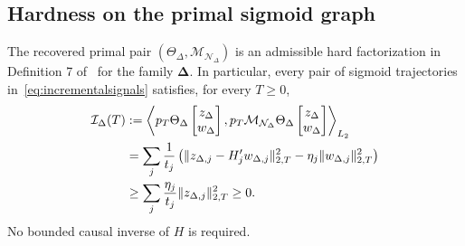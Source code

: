 \subsection{Hardness on the primal sigmoid graph}
\begin{prop}\label{prop:alternative}
The recovered primal pair $(\Theta_\Delta,\mathcal M_{\mathcal N_\Delta})$ is an admissible hard factorization in Definition 7 of~\cite{dualPIE} for the family $\boldsymbol\Delta$. In particular, every pair of sigmoid trajectories in~\eqref{eq:incrementalsignals} satisfies, for every $T\ge0$,
\begin{align}\label{eq:dualfirsthard}
 \mathcal I_\Delta(T)
 &: =\left\langle p_T\Theta_\Delta\begin{bmatrix}z_\Delta\\w_\Delta\end{bmatrix},
 p_T\mathcal M_{\mathcal N_\Delta}\Theta_\Delta\begin{bmatrix}z_\Delta\\w_\Delta\end{bmatrix}\right\rangle_{L_2}\notag\\
 &=\sum_j\frac1{t_j}\left(\|z_{\Delta,j}-H_j'w_{\Delta,j}\|_{2,T}^2
 -\eta_j\|w_{\Delta,j}\|_{2,T}^2\right)\notag\\
 &\ge\sum_j\frac{\eta_j}{t_j}\|z_{\Delta,j}\|_{2,T}^2\ge0.
\end{align}
No bounded causal inverse of $H$ is required.
\end{prop}
